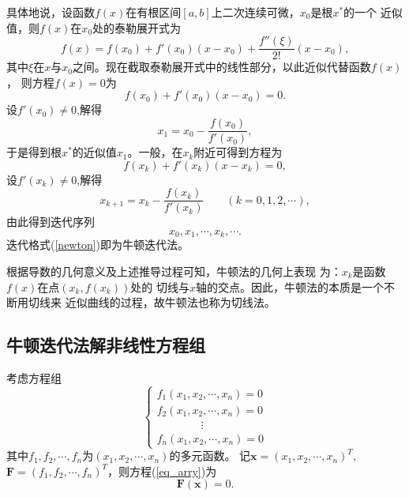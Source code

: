 \documentclass[UTF8,a4paper,12pt]{ctexart}
\begin{document}
	具体地说，设函数$f(x)$在有根区间$[a,b]$上二次连续可微，${x}_0$是根$x^*$的一个
	近似值，则$f(x)$在${x}_0$处的泰勒展开式为
	\begin{displaymath}
		f(x)=f({x}_0)+f'({x}_0)(x-{x}_0)+\frac{f''(\xi)}{2!}(x-{x}_0),
	\end{displaymath}
	其中$\xi$在$x$与${x}_0$之间。现在截取泰勒展开式中的线性部分，以此近似代替函数$f(x)$，
	则方程$f(x)=0$为
	\begin{displaymath}
	   f({x}_0)+f'({x}_0)(x-{x}_0)=0.
   \end{displaymath}
   设$f'({x}_0)\neq 0$,解得
   \begin{displaymath}
	   {x}_1={x}_0-\frac{f({x}_0)}{f'({x}_0)},
   \end{displaymath}
   于是得到根$x^*$的近似值${x}_1$。一般，在${x}_k$附近可得到方程为
   \begin{displaymath}
	   f({x}_k)+f'({x}_k)(x-{x}_k)=0,
   \end{displaymath}
   设$f'({x}_k)\neq 0$,解得
   \begin{equation} \label{newton}
	   {x}_{k+1}={x}_k-\frac{f({x}_k)}{f'({x}_k)} \qquad (k=0,1,2,\cdots),
   \end{equation}
   由此得到迭代序列
   \begin{displaymath}
	   {x}_0,{x}_1,\cdots,{x}_k,\cdots.
   \end{displaymath}
   迭代格式(\ref{newton})即为牛顿迭代法。
   
   根据导数的几何意义及上述推导过程可知，牛顿法的几何上表现
   为：${x}_k$是函数$f(x)$在点$({x}_k,f({x}_k))$处的
   切线与$x$轴的交点。因此，牛顿法的本质是一个不断用切线来
   近似曲线的过程，故牛顿法也称为切线法。
   
	\subsection{牛顿迭代法解非线性方程组}
	考虑方程组
	\begin{equation} \label{eq_arry}%
	   \begin{cases}
		   {f}_1({x}_1,{x}_2,\cdots,{x}_n)=0\\
		   {f}_2({x}_1,{x}_2,\cdots,{x}_n)=0\\
		   \qquad \qquad \vdots\\
		   {f}_n({x}_1,{x}_2,\cdots,{x}_n)=0
	   \end{cases}	
   \end{equation}
   其中${f}_1,{f}_2,\cdots,{f}_n$为$({x}_1,{x}_2,\cdots,{x}_n)$的多元函数。
   记$\boldsymbol{x}=({x}_1,{x}_2,\cdots,{x}_n)^{T}$,
   $\boldsymbol{F}=({f}_1,{f}_2,\cdots,{f}_n)^{T}$，则方程(\ref{eq_arry})为
   \begin{equation} \label{eq}
	   \boldsymbol{F}(\boldsymbol{x})=0.
   \end{equation}
   
\end{document}
